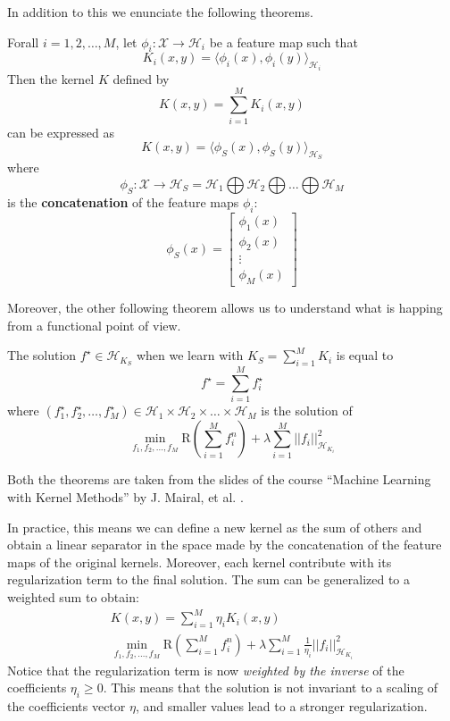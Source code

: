 In addition to this we enunciate the following theorems.

\begin{theorem}
Forall $i = 1, 2, \dots, M$, let $\phi_i : \mathcal{X} \rightarrow \mathcal{H}_i$ be a feature map such that 
$$
    K_i (x, y) = \langle \phi_i(x), \phi_i(y) \rangle_{\mathcal{H}_i}
$$
Then the kernel $K$ defined by
$$
    K(x, y) = \sum_{i=1}^M K_i(x, y)
$$
can be expressed as
$$
    K(x, y) = \langle \phi_S(x), \phi_S(y) \rangle_{\mathcal{H}_S}
$$
where 
$$
\phi_S : \mathcal{X} \rightarrow \mathcal{H}_S = \mathcal{H}_1 \bigoplus \mathcal{H}_2 \bigoplus \dots \bigoplus \mathcal{H}_M
$$
is the \textbf{concatenation} of the feature maps $\phi_i$:
$$
    \phi_S(x) = \left[ \begin{array}{c} \phi_1(x) \\ \phi_2(x) \\ \vdots \\ \phi_M(x) \end{array} \right]
$$
\end{theorem}

Moreover, the other following theorem allows us to understand what is
happing from a functional point of view.

\begin{theorem}
The solution $f^{\star} \in \mathcal{H}_{K_S}$ when we learn with 
$K_S = \sum_{i=1}^{M} K_i$ is equal to
$$
    f^{\star} = \sum_{i=1}^{M} f^{\star}_i
$$
where $(f^{\star}_1, f^{\star}_2, \dots, f^{\star}_M) \in \mathcal{H}_1 \times \mathcal{H}_2 \times \dots \times \mathcal{H}_M$
is the solution of
$$
    \min_{f_1, f_2, \dots, f_M} \text{R}(\sum_{i=1}^{M} f_i^n) + \lambda \sum_{i=1}^{M} || f_i ||_{\mathcal{H}_{K_i}}^2
$$
\end{theorem}
Both the theorems are taken from the slides of the course
\enquote{Machine Learning with Kernel Methods} by J. Mairal, et al.
\cite{mairal2022kernelmethods}.


In practice, this means we can define a new kernel as the sum of others
and obtain a linear separator in the space made by the concatenation of
the feature maps of the original kernels. Moreover, each kernel contribute
with its regularization term to the final solution. The sum can be generalized
to a weighted sum to obtain:
\begin{align*}
    K(x, y) = \sum_{i=1}^{M} \eta_i K_i(x, y) \\
    \min_{f_1, f_2, \dots, f_M} \text{R}(\sum_{i=1}^{M} f_i^n) + \lambda \sum_{i=1}^{M} \frac{1}{\eta_i} || f_i ||_{\mathcal{H}_{K_i}}^2
\end{align*}
Notice that the regularization term is now \textit{weighted by the inverse} of the
coefficients $\eta_i \ge 0$. This means that the solution is not invariant to a scaling
of the coefficients vector $\eta$, and smaller values lead to a stronger regularization.


